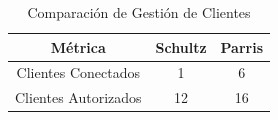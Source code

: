 \begin{table}[H]
\centering
\begin{tabular}{|c|c|c|}
\hline
\textbf{Métrica} & \textbf{Schultz} & \textbf{Parris} \\
\hline
\hspace{30pt}Clientes Conectados\hspace{30pt} &
\hspace{30pt}1\hspace{30pt} & 
\hspace{30pt}6\hspace{30pt} \\
\hline
\hspace{30pt}Clientes Autorizados\hspace{30pt} &
\hspace{30pt}12\hspace{30pt} & 
\hspace{30pt}16\hspace{30pt} \\
\hline
\end{tabular}
\caption{Comparación de Gestión de Clientes}
\label{clients_com}
\end{table}
